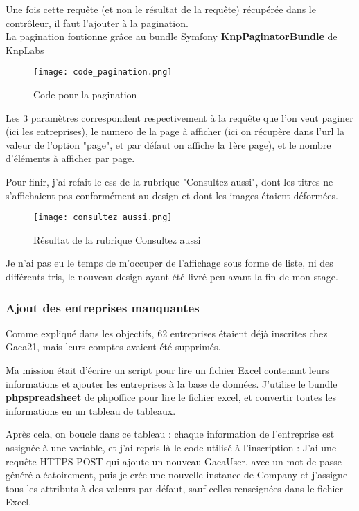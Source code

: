 Une fois cette requête (et non le résultat de la requête) récupérée dans le contrôleur, il faut l'ajouter à la pagination.\\

La pagination fontionne grâce au bundle Symfony \textbf{KnpPaginatorBundle} de KnpLabs

\begin{figure}[H]
    \texttt{[image: code\_pagination.png]}
    \caption{Code pour la pagination}
\end{figure}

Les 3 paramètres correspondent respectivement à la requête que l'on veut paginer (ici les entreprises), 
le numero de la page à afficher (ici on récupère dans l'url la valeur de l'option "page", et par défaut on affiche la 1ère page),
et le nombre d'éléments à afficher par page.

Pour finir, j'ai refait le css de la rubrique "Consultez aussi", dont les titres ne s'affichaient pas conformément au design et dont les images étaient déformées.

\begin{figure}[H]
    \texttt{[image: consultez\_aussi.png]}
    \caption{Résultat de la rubrique Consultez aussi}
\end{figure}

Je n'ai pas eu le temps de m'occuper de l'affichage sous forme de liste, ni des différents tris, le nouveau design ayant été livré peu avant la fin de mon stage.

\subsubsection{Ajout des entreprises manquantes}


Comme expliqué dans les objectifs, 62 entreprises étaient déjà inscrites chez Gaea21, mais leurs comptes avaient été supprimés.

Ma mission était d'écrire un script pour lire un fichier Excel contenant leurs informations et ajouter les entreprises à la base de données.
J'utilise le bundle \textbf{phpspreadsheet} de phpoffice pour lire le fichier excel, et convertir toutes les informations en un tableau de tableaux.

Après cela, on boucle dans ce tableau : chaque information de l'entreprise est assignée à une variable, et j'ai repris là le code utilisé à l'inscription : 
J'ai une requête HTTPS POST qui ajoute un nouveau GaeaUser, avec un mot de passe généré aléatoirement, puis je crée une nouvelle instance de Company et j'assigne tous les attributs à des valeurs par défaut, sauf celles renseignées dans le fichier Excel.


